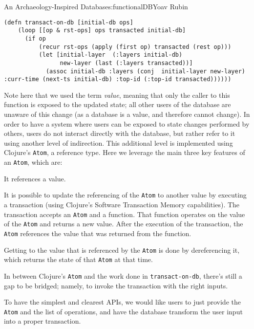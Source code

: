 \begin{aosachapter}{An Archaeology-Inspired Database}{s:functionalDB}{Yoav Rubin}
\begin{verbatim}
(defn transact-on-db [initial-db ops]
    (loop [[op & rst-ops] ops transacted initial-db]
      (if op
          (recur rst-ops (apply (first op) transacted (rest op)))
          (let [initial-layer  (:layers initial-db)
                new-layer (last (:layers transacted))]
            (assoc initial-db :layers (conj  initial-layer new-layer) :curr-time (next-ts initial-db) :top-id (:top-id transacted))))))
\end{verbatim}

Note here that we used the term \emph{value}, meaning that only the
caller to this function is exposed to the updated state; all other users
of the database are unaware of this change (as a database is a value,
and therefore cannot change). In order to have a system where users can
be exposed to state changes performed by others, users do not interact
directly with the database, but rather refer to it using another level
of indirection. This additional level is implemented using Clojure's
\texttt{Atom}, a reference type. Here we leverage the main three key
features of an \texttt{Atom}, which are:

\begin{aosaenumerate}
\def\labelenumi{\arabic{enumi}.}

\item
  It references a value.
\item
  It is possible to update the referencing of the \texttt{Atom} to
  another value by executing a transaction (using Clojure's Software
  Transaction Memory capabilities). The transaction accepts an
  \texttt{Atom} and a function. That function operates on the value of
  the \texttt{Atom} and returns a new value. After the execution of the
  transaction, the \texttt{Atom} references the value that was returned
  from the function.
\item
  Getting to the value that is referenced by the \texttt{Atom} is done
  by dereferencing it, which returns the state of that \texttt{Atom} at
  that time.
\end{aosaenumerate}

In between Clojure's \texttt{Atom} and the work done in
\texttt{transact-on-db}, there's still a gap to be bridged; namely, to
invoke the transaction with the right inputs.

To have the simplest and clearest APIs, we would like users to just
provide the \texttt{Atom} and the list of operations, and have the
database transform the user input into a proper transaction.


\end{aosachapter}
